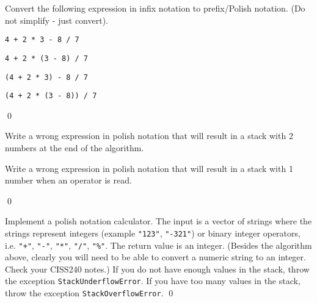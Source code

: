 \begin{ex}
  Convert the following expression in infix notation to
  prefix/Polish notation. (Do not simplify - just convert).
  \begin{tightlist}
    \item \texttt{4 + 2 * 3 - 8 / 7}
    \item \texttt{4 + 2 * (3 - 8) / 7}
    \item \texttt{(4 + 2 * 3) - 8 / 7}
    \item \texttt{(4 + 2 * (3 - 8)) / 7}    
  \end{tightlist}
  \qed
\end{ex}


\begin{ex}
\begin{tightlist}
  \item Write a wrong expression in polish notation that will
  result in a stack with 2 numbers at the end of the algorithm.
  \item Write a wrong expression in polish notation that will
  result in a stack with 1 number when an operator is read.
\end{tightlist}
\qed
\end{ex}


\begin{ex}
Implement a polish notation calculator.
The input is a vector of strings where the strings represent integers (example
\texttt{"123"}, \texttt{"-321"})
or binary integer operators, i.e.
\verb!"+"!,
\verb!"-"!,
\verb!"*"!,
\verb!"/"!,
\verb!"%"!.
The return value is an integer.
(Besides the algorithm above, clearly you will
need to be able to convert a numeric string to an integer.
Check your CISS240 notes.)
If you do not have enough values in the stack, throw the exception
\texttt{StackUnderflowError}.
If you have too many values in the stack, throw the exception
\texttt{StackOverflowError}.
\qed
\end{ex}

